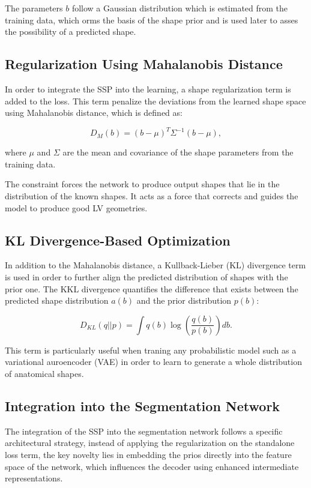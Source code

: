 The parameters $b$ follow a Gaussian distribution which is estimated from the training data, which orms the basis of the shape prior and is used later to asses the possibility of a predicted shape.

\subsection{Regularization Using Mahalanobis Distance}
In order to integrate the SSP into the learning, a shape regularization term is added to the loss. This term penalize the deviations from the learned shape space using Mahalanobis distance, which is defined as:

\begin{equation} D_M(b) = (b - \mu)^T \Sigma^{-1} (b - \mu), \end{equation}

where $\mu$ and $\Sigma$ are the mean and covariance of the shape parameters from the training data.

The constraint forces the network to produce output shapes that lie in the distribution of the known shapes. It acts as a force that corrects and guides the model to produce good LV geometries.

\subsection{KL Divergence-Based Optimization}
In addition to the Mahalanobis distance, a Kullback-Lieber (KL) divergence term is used in order to further align the predicted distribution of shapes with the prior one. The KKL divergence quantifies the difference that exists between the predicted shape distribution $a(b)$ and the prior distribution $p(b)$:

\begin{equation} D_{KL}(q || p) = \int q(b) \log \left(\frac{q(b)}{p(b)}\right) db. \end{equation}

This term is particularly useful when traning any probabilistic model such as a variational auroencoder (VAE) in order to learn to generate a whole distribution of anatomical shapes.

\subsection{Integration into the Segmentation Network}
The integration of the SSP into the segmentation network follows a specific architectural strategy, instead of applying the regularization on the standalone loss term, the key novelty lies in embedding the prios directly into the feature space of the network, which influences the decoder using enhanced intermediate representations. 

